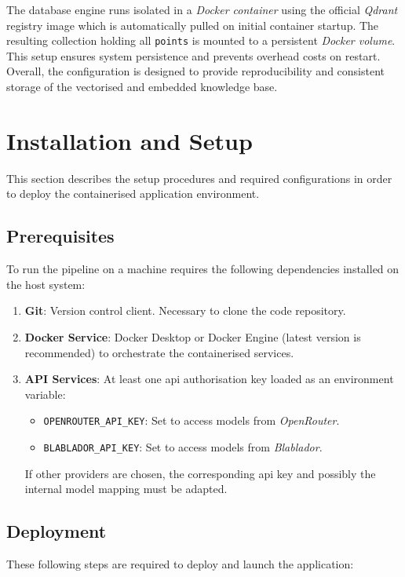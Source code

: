 The database engine runs isolated in a \textit{Docker container} using the official \textit{Qdrant} registry image which is automatically pulled on initial container startup.
The resulting collection holding all \texttt{points} is mounted to a persistent \textit{Docker volume}.
This setup ensures system persistence and prevents overhead costs on restart.
Overall, the configuration is designed to provide reproducibility and consistent storage of the vectorised and embedded knowledge base. 
%
\section*{Installation and Setup}\label{app:installation_setup}
This section describes the setup procedures and required configurations in order to deploy the containerised application environment.

\subsection*{Prerequisites}
To run the pipeline on a machine requires the following dependencies installed on the host system:
\begin{enumerate}
    \item \textbf{Git}: Version control client. Necessary to clone the code repository.
    \item \textbf{Docker Service}: Docker Desktop or Docker Engine (latest version is recommended) to orchestrate the containerised services.
    \item \textbf{API Services}: At least one \ac{api} authorisation key loaded as an environment variable:
    \begin{itemize}
        \item \texttt{OPENROUTER\_API\_KEY}: Set to access models from \textit{OpenRouter}.
        \item \texttt{BLABLADOR\_API\_KEY}: Set to access models from \textit{Blablador}.
    \end{itemize}
    If other providers are chosen, the corresponding \ac{api} key and possibly the internal model mapping must be adapted.
\end{enumerate}

\subsection*{Deployment}\label{app:deployment}
These following steps are required to deploy and launch the application:

